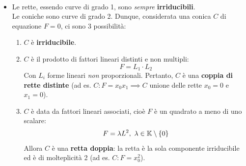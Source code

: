 \begin{examples}~{}
	\begin{itemize}
		\item Le rette, essendo curve di grado 1, sono \textit{sempre} \textbf{irriducibili}.\\
		Le coniche sono curve di grado 2. Dunque, considerata una conica $C$ di equazione $F=0$, ci sono 3 possibilità:
		\begin{enumerate}
			\item	$C$ è \textbf{irriducibile}.
			\item	$C$ è il prodotto di fattori lineari distinti e non multipli:
			\begin{equation}
				F=L_1\cdot L_2
			\end{equation}
			Con $L_i$ forme lineari \textit{non} proporzionali. Pertanto, $C$ è una \textbf{coppia di rette distinte} (ad es. $C\colon F=x_0x_1\implies C$ unione delle rette $x_0=0$ e $x_1=0$).
			\item	$C$ è data da fattori lineari associati, cioè $F$ è un quadrato a meno di uno scalare:
			\begin{equation}
				F=\lambda L^2,\ \lambda\in\kamp\setminus\{0\}
			\end{equation}
			Allora $C$ è una \textbf{retta doppia}: la retta è la sola componente irriducibile ed è di molteplicità 2 (ad es. $C\colon F=x_0^2$).
		\end{enumerate}
	\end{itemize}
\vspace{-3mm}
\end{examples}


